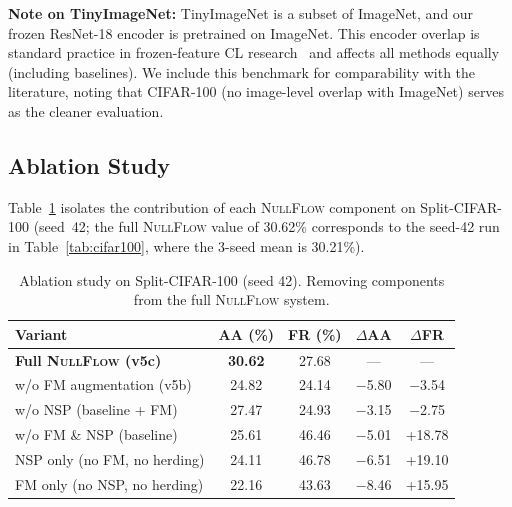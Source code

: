 \documentclass[10pt,twocolumn,letterpaper]{article}
\newcommand{\best}[1]{\textbf{\textcolor{bestcolor}{#1}}}
\newcommand{\ours}{\textsc{NullFlow}}
\begin{document}
\textbf{Note on TinyImageNet:} TinyImageNet is a subset of ImageNet, and our frozen ResNet-18 encoder is pretrained on ImageNet. This encoder overlap is standard practice in frozen-feature CL research~\cite{zhou2024revisiting,janson2022simple} and affects all methods equally (including baselines). We include this benchmark for comparability with the literature, noting that CIFAR-100 (no image-level overlap with ImageNet) serves as the cleaner evaluation.

\FloatBarrier
\subsection{Ablation Study}

Table~\ref{tab:ablation} isolates the contribution of each \ours{} component on Split-CIFAR-100 (seed~42; the full \ours{} value of 30.62\% corresponds to the seed-42 run in Table~\ref{tab:cifar100}, where the 3-seed mean is 30.21\%).

\begin{table}[!t]
\centering
\caption{Ablation study on Split-CIFAR-100 (seed 42). Removing components from the full \ours{} system.}
\label{tab:ablation}
\setlength{\tabcolsep}{3pt}
\footnotesize
\begin{tabular}{@{}lcccc@{}}
\toprule
\textbf{Variant} & \textbf{AA (\%)} & \textbf{FR (\%)} & \textbf{$\Delta$AA} & \textbf{$\Delta$FR} \\
\midrule
\textbf{Full \ours{} (v5c)}  & \best{30.62} & 27.68 & ---    & ---     \\
w/o FM augmentation (v5b)     & 24.82        & 24.14 & $-$5.80 & $-$3.54 \\
w/o NSP (baseline + FM)       & 27.47        & 24.93 & $-$3.15 & $-$2.75 \\
w/o FM \& NSP (baseline)      & 25.61        & 46.46 & $-$5.01 & +18.78  \\
NSP only (no FM, no herding)  & 24.11        & 46.78 & $-$6.51 & +19.10  \\
FM only (no NSP, no herding)  & 22.16        & 43.63 & $-$8.46 & +15.95  \\
\bottomrule
\end{tabular}
\end{table}
\end{document}
